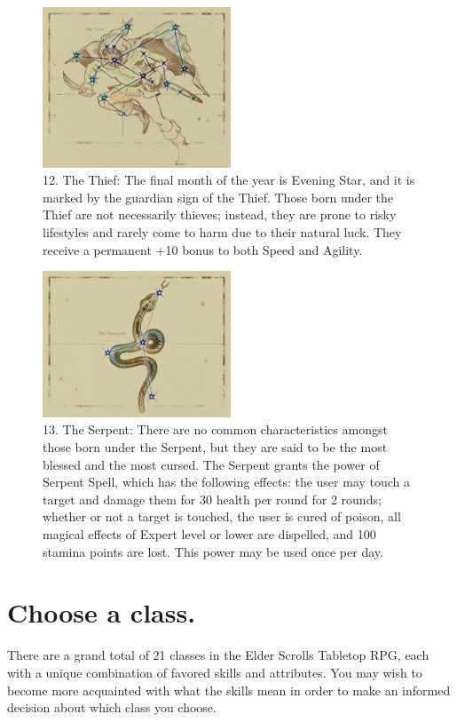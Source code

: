 \documentclass[12pt]{book}
\begin{document}
\begin{figure}[H]
\includegraphics[width=0.5\textwidth]{Thief.png}
\centering
\caption*{12. The Thief: The final month of the year is Evening Star, and it is marked by the guardian sign of the Thief. Those born under the Thief are not necessarily thieves; instead, they are prone to risky lifestyles and rarely come to harm due to their natural luck. They receive a permanent +10 bonus to both Speed and Agility.}
\end{figure}

\begin{figure}[H]
\includegraphics[width=0.5\textwidth]{Serpent.png}
\centering
\caption*{13. The Serpent: There are no common characteristics amongst those born under the Serpent, but they are said to be the most blessed and the most cursed. The Serpent grants the power of Serpent Spell, which has the following effects: the user may touch a target and damage them for 30 health per round for 2 rounds; whether or not a target is touched, the user is cured of poison, all magical effects of Expert level or lower are dispelled, and 100 stamina points are lost. This power may be used once per day.}
\end{figure}

\newpage
\section{Choose a class.}
There are a grand total of 21 classes in the Elder Scrolls Tabletop RPG, each with a unique combination of favored skills and attributes. You may wish to become more acquainted with what the skills mean in order to make an informed decision about which class you choose.
\end{document}
